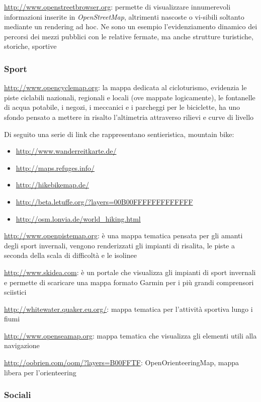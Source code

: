 \documentclass[a4paper,twoside,12pt,]{article}
\newcommand{\osm}{\emph{OpenStreetMap}\xspace}
\begin{document}
\url{http://www.openstreetbrowser.org}: permette di visualizzare innumerevoli informazioni inserite in \osm, altrimenti nascoste o vi-sibili soltanto mediante un rendering ad hoc. Ne sono un esempio l'evidenziamento dinamico dei percorsi dei mezzi pubblici con le relative fermate, ma anche strutture turistiche, storiche, sportive

\subsubsection{Sport}
\url{http://www.opencyclemap.org}: la mappa dedicata al cicloturismo, evidenzia le piste ciclabili nazionali, regionali e locali (ove mappate logicamente), le fontanelle di acqua potabile, i negozi, i meccanici e i parcheggi per le biciclette, ha uno sfondo pensato a mettere in risalto l'altimetria attraverso rilievi e curve di livello

Di seguito una serie di link che rappresentano sentieristica, mountain bike:
\begin{itemize}
 \item \url{http://www.wanderreitkarte.de/}
 \item \url{http://maps.refuges.info/}
 \item \url{http://hikebikemap.de/}
 \item \url{http://beta.letuffe.org/?layers=00B00FFFFFFFFFFFFF}
 \item \url{http://osm.lonvia.de/world_hiking.html}
\end{itemize}

\url{http://www.openpistemap.org}: è una mappa tematica pensata per gli amanti degli sport invernali, vengono renderizzati gli impianti di risalita, le piste a seconda della scala di difficoltà e le isolinee

\url{http://www.skidea.com}: è un portale che visualizza gli impianti di sport invernali e permette di scaricare una mappa formato Garmin per i più grandi comprensori sciistici

\url{http://whitewater.quaker.eu.org/}: mappa tematica per l'attività sportiva lungo i fiumi

\url{http://www.openseamap.org}: mappa tematica che visualizza gli elementi utili alla navigazione

\url{http://oobrien.com/oom/?layers=B00FFTF}: OpenOrienteeringMap, mappa libera per l'orienteering

\subsubsection{Sociali}
\end{document}
